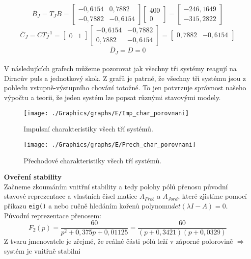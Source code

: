 \documentclass{article}
\begin{document}
				\[\overline{B}_{J} = T_{J}B = \begin{bmatrix}
					-0,6154&0,7882\\
					-0,7882&-0,6154
				\end{bmatrix}\begin{bmatrix}
					400\\0
				\end{bmatrix}=\begin{bmatrix}
					-246,1649\\-315,2822
				\end{bmatrix}\]
				\[\overline{C}_{J}=CT_{J}^{-1}=\begin{bmatrix}
					0&1
				\end{bmatrix}\begin{bmatrix}
					-0,6154&-0,7882\\
					0,7882&-0,6154
				\end{bmatrix}=\begin{bmatrix}
					0,7882&-0,6154
				\end{bmatrix}\]
				\[\overline{D}_{J}=D=0\]
			\vspace{1cm}\\
			V následujících grafech můžeme pozorovat jak všechny tři systémy reagují na Diracův puls a jednotkový skok. Z grafů je patrné, že všechny tři systému jsou z pohledu vstupně-výstupního chování totožné. To jen potvrzuje správnost našeho výpočtu a teorii, že jeden systém lze popsat různými stavovými modely.
				\begin{figure}[H]
					\centering
					\texttt{[image: ./Graphics/graphs/E/Imp\_char\_porovnani]}
					\caption{Impulsní charakteristiky všech tří systémů.}
				\end{figure}
				\begin{figure}[H]
					\centering
					\texttt{[image: ./Graphics/graphs/E/Prech\_char\_porovnani]}
					\caption{Přechodové charakteristiky všech tří systémů.}
				\end{figure}
			\newpage
			\noindent \textbf{Oveření stability}\\
			Začneme zkoumáním vnitřní stability a tedy polohy pólů přenosu původní stavové reprezentace a vlastních čísel matice \(\overline{A}_{Frob}\) a \(\overline{A}_{Jord}\), které zjistíme pomocí příkazu \verb*|eig()| a nebo ručně hledáním kořenů polynomu\(det(\lambda I-A)=0\).\\
			Původní reprezentace přenosem:
			\[F_{2}(p)=\frac{60}{p^2 + 0,375 p + 0,01125}=\frac{60}{(p+0,3421)(p+0,0329)}\]
			Z tvaru jmenovatele je zřejmé, že reálné části pólů leží v záporné polorovině $\Rightarrow$systém je vnitřně stabilní
\end{document}
